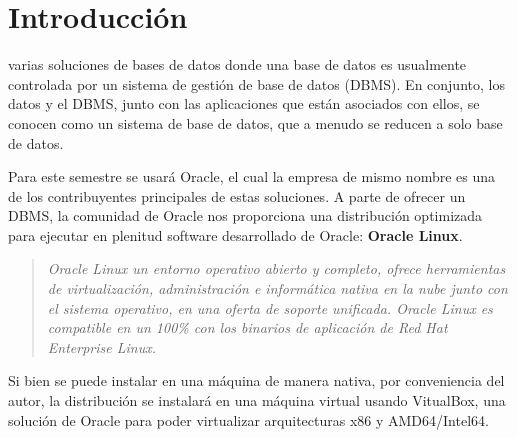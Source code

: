 \documentclass{IEEEtran}
\begin{document}
\author{Cristian Romero Andrade}
\title{\tituloPractica{}}

\author{}

\date{ }



\maketitle{}
\tableofcontents{}

\dotfill{}

\begin{abstract}
  En la presente se instala el sistema operativo Oracle Linux, el cual se usará el
  en conjunto con el DBMS de Oracle. Se instalara en un entorno virtual usando
  VirtualBox.
\end{abstract}

\dotfill{}

\section{Introducción}\label{sec:introduccion}
 varias soluciones de bases de datos donde una base de datos es usualmente
controlada por un sistema de gestión de base de datos (DBMS). En conjunto, los datos
y el DBMS, junto con las aplicaciones que están asociados con ellos, se conocen como
un sistema de base de datos, que a menudo se reducen a solo base de datos.

Para este semestre se usará Oracle, el cual la empresa de mismo nombre es una de los
contribuyentes principales de estas soluciones. A parte de ofrecer un DBMS, la
comunidad de Oracle nos proporciona una distribución optimizada para ejecutar
en plenitud software desarrollado de Oracle: \textbf{Oracle Linux}.

\begin{quote}
  \textit{
    Oracle Linux un entorno operativo abierto y completo, ofrece herramientas de
    virtualización, administración e informática nativa en la nube junto con el sistema
    operativo, en una oferta de soporte unificada. Oracle Linux es compatible en un 100\%
    con los binarios de aplicación de Red Hat Enterprise Linux\cite{Oracle}.
  }
\end{quote}

Si bien se puede instalar en una máquina de manera nativa, por conveniencia del autor, la distribución
se instalará en una máquina virtual usando VitualBox, una solución de Oracle para poder
virtualizar arquitecturas x86 y AMD64/Intel64.
\end{document}
